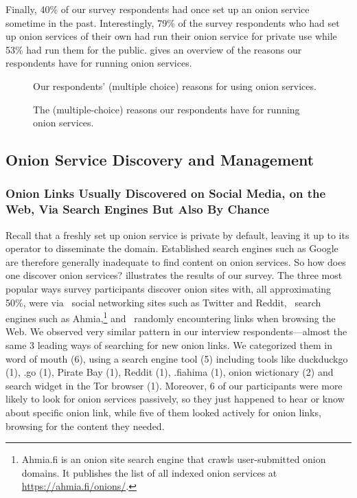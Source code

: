 Finally, 40\% of our survey respondents had once set up an onion service
sometime in the past.  Interestingly, 79\% of the survey respondents who had set
up onion services of their own had run their onion service for private use while
53\% had run them for the public.  gives an
overview of the reasons our respondents have for running onion services.

\begin{figure}[t]
    \centering
    
    \caption{Our respondents' (multiple choice) reasons for using onion
    services.}
    \label{fig:onion-usage}
\end{figure}

\begin{figure}[t]
    \centering
    
    \caption{The (multiple-choice) reasons our respondents have for running
    onion services.}
    \label{fig:onion-operation-reasons}
\end{figure}

\subsection{Onion Service Discovery and Management}
\label{sec:manage}

\subsubsection{Onion Links Usually Discovered on Social Media, on the Web, Via Search Engines But Also By Chance}

Recall that a freshly set up onion service is private by default, leaving it up
to its operator to disseminate the domain.  Established search engines such as
Google are therefore generally inadequate to find content on onion services.  So
how does one discover onion services?   illustrates
the results of our survey.  The three most popular ways survey participants
discover onion sites with, all approximating 50\%, were via \first~social
networking sites such as Twitter and Reddit, \second~search engines such as
Ahmia,\footnote{Ahmia.fi is an onion site search engine that crawls
user-submitted onion domains.  It publishes the list of all indexed onion
services at \url{https://ahmia.fi/onions/}.} and \third~randomly encountering
links when browsing the Web.  We observed very similar pattern in our interview
respondents---almost the same 3 leading ways of searching for new onion links.
We categorized them in word of mouth (6), using a search engine tool (5)
including tools like duckduckgo (1), .go (1), Pirate Bay (1), Reddit (1),
.fiahima (1), onion wictionary (2) and search widget in the Tor browser (1).
Moreover, 6 of our participants were more likely to look for onion services
passively, so they just happened to hear or know about specific onion link,
while five of them looked actively for onion links, browsing for the content
they needed.

